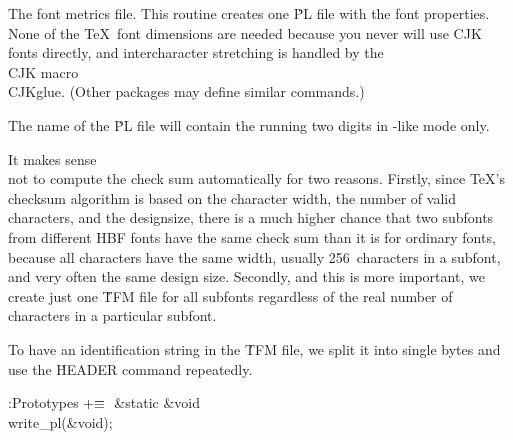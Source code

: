 The font metrics file.
This routine creates one \.{PL} file with the font properties. None of the
\TeX\ font dimensions are needed because you never will use CJK fonts
directly, and intercharacter stretching is handled by the \\{CJK} macro
\.{\\CJKglue}. (Other packages may define similar commands.)

The name of the \.{PL} file will contain the running two digits in
\mf-like mode only.

It makes sense \\{not} to compute the check sum automatically for two
reasons. Firstly, since \TeX's checksum algorithm is based on the character
width, the number of valid characters, and the designsize, there is a much
higher chance that two subfonts from different HBF fonts have the same check
sum than it is for ordinary fonts, because all characters have the same
width, usually 256~characters in a subfont, and very often the same design
size. Secondly, and this is more important, we create just one
\.{TFM} file for all subfonts regardless of the real number of characters
in a particular subfont.

To have an identification string in the \.{TFM} file, we split it into
single bytes and use the \.{HEADER} command repeatedly.

\Y\B\4:Prototypes\X${}\mathrel+\equiv{}$\6
\&{static} \&{void} \\{write\_pl}(\&{void});\par
\fi

